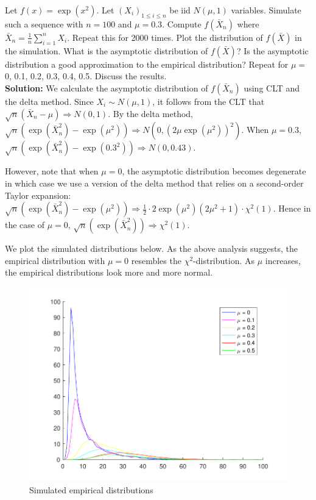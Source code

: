 \documentclass[11pt,letterpaper]{article}                  %
\begin{document}
\bigskip
\begin{problem}
Let $f(x) = \exp (x^2)$.
Let $(X_i)_{1 \leq i \leq n}$ be iid $N(\mu,1)$ variables.
Simulate such a sequence with $n = 100$ and $\mu = 0.3$.
Compute $f (\bar{X}_n)$ where $\bar{X}_n = \frac{1}{n} \sum_{i=1}^n X_i$.
Repeat this for 2000 times. Plot the distribution of $f (\bar{X})$ in the simulation.
What is the asymptotic distribution of $f (\bar{X})$?
Is the asymptotic distribution a good approximation to the empirical distribution?
Repeat for $\mu =$ 0, 0.1, 0.2, 0.3, 0.4, 0.5.
Discuss the results. \\

\textbf{Solution:}
We calculate the asymptotic distribution of $f(\bar{X}_n)$ using CLT and the delta method.
Since $X_i \sim N(\mu, 1)$, it follows from the CLT that $\sqrt{n} (\bar{X}_n - \mu) \Rightarrow N (0, 1)$.
By the delta method, $\sqrt{n} (\exp(\bar{X}_n^2) - \exp(\mu^2)) \Rightarrow N (0, (2 \mu \exp(\mu^2))^2)$.
When $\mu = 0.3$, $\sqrt{n} (\exp(\bar{X}_n^2) - \exp(0.3^2)) \Rightarrow N (0, 0.43)$.

However, note that when $\mu = 0$, the asymptotic distribution becomes degenerate in which case we use a version of the delta method that relies on a second-order Taylor expansion:
$\sqrt{n} (\exp(\bar{X}_n^2) - \exp(\mu^2)) \Rightarrow \frac{1}{2} \cdot 2 \exp(\mu^2) (2\mu^2 + 1) \cdot \chi^2(1)$.
Hence in the case of $\mu = 0$, $\sqrt{n} (\exp(\bar{X}_n^2)) \Rightarrow \chi^2(1)$.

We plot the simulated distributions below.
As the above analysis suggests, the empirical distribution with $\mu = 0$ resembles the $\chi^2$-distribution.
As $\mu$ increases, the empirical distributions look more and more normal.

\begin{figure}[H]
  \centering
  \caption{Simulated empirical distributions}
  \includegraphics[scale=0.6]{prob12.pdf}
\end{figure}
\end{problem}
\end{document}
